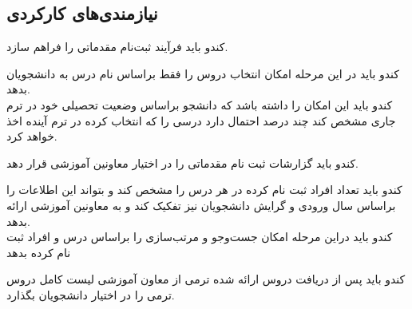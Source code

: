 \documentclass{report}
\begin{document}
\subsection{نیازمندی‌های کارکردی}
کندو باید فرآیند ثبت‌نام مقدماتی را فراهم سازد.

\begin{adjustwidth}{2em}{0pt}
کندو باید در این مرحله امکان انتخاب دروس را فقط براساس نام درس به دانشجویان بدهد.
\\
کندو باید این امکان را داشته باشد که دانشجو براساس وضعیت تحصیلی خود در ترم جاری مشخص کند چند درصد احتمال دارد درسی را که انتخاب کرده در ترم آینده اخذ خواهد کرد.
\end{adjustwidth}
کندو باید گزارشات ثبت نام مقدماتی را در اختیار معاونین آموزشی قرار دهد.
\begin{adjustwidth}{2em}{0pt}
کندو باید تعداد افراد ثبت نام کرده در هر درس را مشخص کند و بتواند این اطلاعات را براساس سال ورودی و گرایش دانشجویان نیز تفکیک کند و به معاونین آموزشی ارائه بدهد.
                                                                                                                                                                                                                   \\                                                                                                                                                                                                                         کندو باید دراین مرحله امکان جست‌وجو و مرتب‌سازی را براساس درس و افراد ثبت نام کرده بدهد
                                                                                                                                                                                                                                                                                                                                                                                                                                                \end{adjustwidth}
                                                                                                                                                                                                                                                                                                                                                                                                                                                                                                                                                                                                                                                                          کندو باید پس از دریافت دروس ارائه شده ترمی از معاون آموزشی لیست کامل دروس ترمی را در اختیار دانشجویان بگذارد. 
\end{document}
